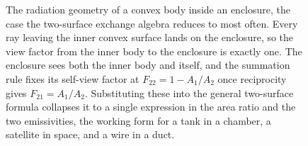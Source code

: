 \begin{figure}[htbp]
\centering
{}
\caption[Concentric-body radiation geometry and its view
factors]{The radiation geometry of a convex body inside an enclosure,
the case the two-surface exchange algebra reduces to most often. Every
ray leaving the inner convex surface lands on the enclosure, so the view
factor from the inner body to the enclosure is exactly one. The enclosure
sees both the inner body and itself, and the summation rule fixes its
self-view factor at $F_{22}=1-A_1/A_2$ once reciprocity gives
$F_{21}=A_1/A_2$. Substituting these into the general two-surface formula
collapses it to a single expression in the area ratio and the two
emissivities, the working form for a tank in a chamber, a satellite in
space, and a wire in a duct.}
\label{fig:vol04ch05:concentric-cylinders}
\end{figure}
